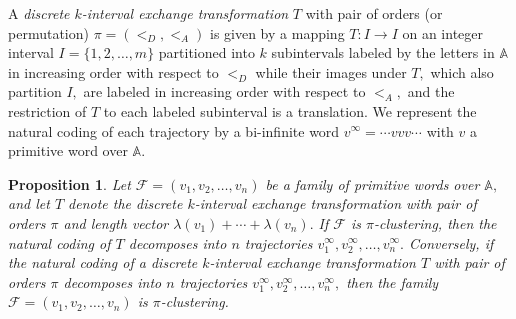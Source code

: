 \documentclass[12pt,a4paper]{amsart}
\newcommand{\A}{{\mathbb A}}
\newtheorem{proposition}{Proposition}
\begin{document}
A {\it discrete $k$-interval exchange transformation} $T$  with pair of orders (or permutation) $\pi= (<_D, <_A)$  is given by a mapping $T:I\rightarrow I$ on an integer interval $I=\{1,2,\ldots,m\}$  partitioned into $k$ subintervals labeled by the letters in $\A$ in increasing order with respect to $<_D$   while their images  under $T,$ which also partition $I,$ are labeled in increasing order with respect to  $<_A,$ and the restriction of $T$ to each labeled subinterval is a translation. We represent the natural coding of each trajectory by a bi-infinite word $v^\infty=\cdots vvv\cdots$ with $v$ a primitive word over $\A.$ 


 \begin{proposition}\label{fequiv2} Let $\mathcal F=(v_1,v_2,\ldots ,v_n)$ be a family of primitive words over $\A,$ and let $T$ denote the discrete $k$-interval exchange transformation with pair of orders $\pi$ and length vector $\lambda (v_1)+\cdots + \lambda (v_n).$ If $\mathcal F $ is $\pi$-clustering, then the  natural coding of $T$ decomposes into $n$ trajectories $v_1^{ \infty}, v_2^{ \infty} , \ldots , v_n^{ \infty}.$ Conversely, if the natural coding of a discrete $k$-interval exchange transformation $T$ with pair of orders $\pi$ decomposes into $n$ trajectories $v_1^{ \infty}, v_2^{ \infty} , \ldots , v_n^{ \infty},$   then  the family $\mathcal F=(v_1,v_2,\ldots ,v_n)$ is $\pi$-clustering. 
\end{proposition}
\end{document}
